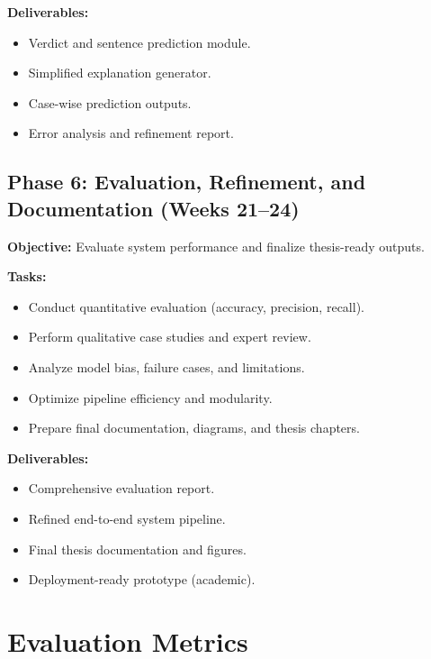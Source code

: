 \textbf{Deliverables:}
\begin{itemize}
	\item Verdict and sentence prediction module.
	\item Simplified explanation generator.
	\item Case-wise prediction outputs.
	\item Error analysis and refinement report.
\end{itemize}

\subsection{Phase 6: Evaluation, Refinement, and Documentation (Weeks 21--24)}
\textbf{Objective:} Evaluate system performance and finalize thesis-ready outputs.

\textbf{Tasks:}
\begin{itemize}
	\item Conduct quantitative evaluation (accuracy, precision, recall).
	\item Perform qualitative case studies and expert review.
	\item Analyze model bias, failure cases, and limitations.
	\item Optimize pipeline efficiency and modularity.
	\item Prepare final documentation, diagrams, and thesis chapters.
\end{itemize}

\textbf{Deliverables:}
\begin{itemize}
	\item Comprehensive evaluation report.
	\item Refined end-to-end system pipeline.
	\item Final thesis documentation and figures.
	\item Deployment-ready prototype (academic).
\end{itemize}




\newpage
\section{Evaluation Metrics}
